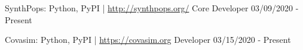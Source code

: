 \vspace{3mm}

\begin{cventries}

  \cvpresentation
    {SynthPops: Python, PyPI | \href{http://synthpops.org/}{http://synthpops.org/}} %
    {Core Developer} %
    {} %
    {03/09/2020 - Present} %

  \cvpresentation
    {Covasim: Python, PyPI | \href{https://covasim.org}{https://covasim.org}} %
    {Developer} %
    {} %
    {03/15/2020 - Present} %
\end{cventries}
